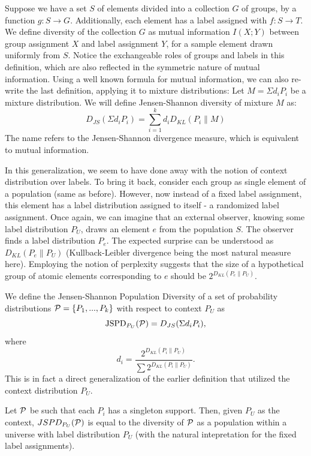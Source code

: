 \documentclass{article} %
\begin{document}
\bed\label{mutual}
Suppose we have a set $S$ of elements divided into a collection $G$ of
groups, by a function $g:S\rightarrow G$. Additionally, each element
has a label assigned with $f:S\rightarrow T$. We define diversity
of the collection $G$ as
mutual information $I(X;Y)$ between group assignment $X$ and label
assignment $Y$, for 
a sample element drawn uniformly from $S$.
\eed
Notice the exchangeable roles of groups and labels in this
definition, which are also reflected in the symmetric nature of mutual
information. Using a well known formula for mutual information, we 
can also re-write the last definition, applying it to mixture
distributions:
\bed\label{mixture}
Let $M=\Sigma d_i P_i$ be a mixture distribution. We will define
Jensen-Shannon diversity of mixture $M$ as:
\[D_{JS}(\Sigma d_iP_i) = \sum_{i=1}^k d_i D_{KL}(P_i\|M)\]
\eed
The name refers to the Jensen-Shannon divergence measure, which
is equivalent to mutual information.

In this generalization, we seem to have done away with the notion of
context distribution over labels. To bring it back, consider each
group as single element of a population (same as before). However, now
instead of a fixed label assignment, this element has a label
distribution assigned to itself - a randomized label assignment. 
Once again, we can imagine that an external observer,
knowing some 
label distribution $P_U$, draws an element $e$ from the population
$S$. The observer finds a label distribution $P_e$. The
expected surprise can be understood as $D_{KL}(P_e\|P_U)$
(Kullback-Leibler divergence being the most natural measure
here). Employing the notion of perplexity suggests that
the size of a hypothetical group of atomic elements corresponding to
$e$ should be $2^{D_{KL}(P_e\|P_U)}$.  

\bed\label{jspd}
We define the Jensen-Shannon Population Diversity of a set of
probability distributions 
${\mathcal P}=\{P_1,...,P_k\}$ with respect to context $P_U$ as
\[\mbox{JSPD}_{P_U}({\mathcal P})=D_{JS}(\Sigma d_i P_i),\]
where 
\[d_{i}=\frac{2^{D_{KL}(P_i\|P_U)}}{\sum 2^{D_{KL}(P_i\|P_U)}}.\]
\eed
This is in fact a direct generalization of the earlier definition that
utilized the context distribution $P_U$.

\bep\label{generalization}
Let ${\mathcal P}$ be such that each $P_i$ has a singleton support. Then, given
$P_U$ as the context,  $JSPD_{P_U}({\mathcal P})$ is equal to the diversity of ${\mathcal P}$ as a
population within a universe with label distribution $P_U$ (with the
natural intepretation for the fixed label assignments).
\eep
\end{document}
